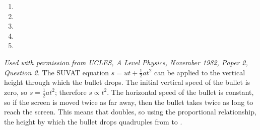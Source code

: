 

\begin{problem} %
{ 
\begin{enumerate}
	\item {}
	\item \choice[b]{10 mm}
	\item \choice[c]{15 mm}
	\item \choice[d]{20 mm}\correct
	\item \choice[e]{25 mm}
\end{enumerate}
}
{\textit{Used with permission from UCLES, A Level Physics, November 1982, Paper 2, Question 2.}}
{ The SUVAT equation $s = ut + \frac{1}{2}at^{2}$ can be applied to the vertical height through which the bullet drops. The initial vertical speed  of the bullet is zero, so $s = \frac{1}{2}at^{2}$; therefore $s \propto t^{2}$. The horizontal speed of the bullet is constant, so if the screen is moved twice as far away, then the bullet takes twice as long to reach the screen. This means that  doubles, so using the proportional relationship, the height by which the bullet drops quadruples from  to  .
}
\end{problem}